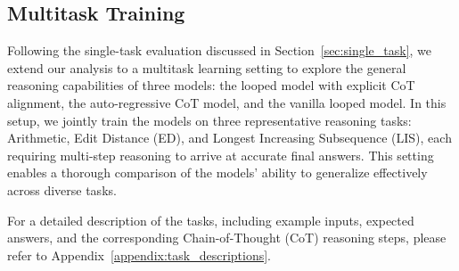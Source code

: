 \subsection{Multitask Training}\label{sec:multitask}
Following the single-task evaluation discussed in Section~\ref{sec:single_task}, we extend our analysis to a multitask learning setting to explore the general reasoning capabilities of three models: the looped model with explicit CoT alignment, the auto-regressive CoT model, and the vanilla looped model. In this setup, we jointly train the models on three representative reasoning tasks: Arithmetic, Edit Distance (ED), and Longest Increasing Subsequence (LIS), each requiring multi-step reasoning to arrive at accurate final answers. This setting enables a thorough comparison of the models' ability to generalize effectively across diverse tasks.

For a detailed description of the tasks, including example inputs, expected answers, and the corresponding Chain-of-Thought (CoT) reasoning steps, please refer to Appendix~\ref{appendix:task_descriptions}.





